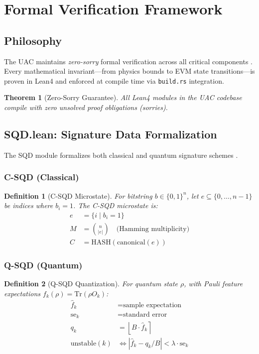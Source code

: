 \documentclass[11pt,a4paper]{article}
\newtheorem{theorem}{Theorem}
\newtheorem{definition}{Definition}
\theoremstyle{plain}
\begin{document}
\section{Formal Verification Framework}

\subsection{Philosophy}

The UAC maintains \textit{zero-sorry} formal verification across all critical components \cite{leanQuantum, leanOptimization}. Every mathematical invariant—from physics bounds to EVM state transitions—is proven in Lean4 and enforced at compile time via \texttt{build.rs} integration.

\begin{theorem}[Zero-Sorry Guarantee]
All Lean4 modules in the UAC codebase compile with zero unsolved proof obligations (\textit{sorries}).
\end{theorem}

\subsection{SQD.lean: Signature Data Formalization}

The SQD module formalizes both classical and quantum signature schemes \cite{sqdSpecification}.

\subsubsection{C-SQD (Classical)}

\begin{definition}[C-SQD Microstate]
For bitstring $b \in \{0,1\}^n$, let $e \subseteq \{0,\ldots,n-1\}$ be indices where $b_i = 1$. The C-SQD microstate is:
\begin{align}
    e &= \{i \mid b_i = 1\} \\
    M &= \binom{n}{|e|} \quad \text{(Hamming multiplicity)} \\
    C &= \text{HASH}(\text{canonical}(e))
\end{align}
\end{definition}

\subsubsection{Q-SQD (Quantum)}

\begin{definition}[Q-SQD Quantization]
For quantum state $\rho$, with Pauli feature expectations $f_k(\rho) = \text{Tr}(\rho O_k)$:
\begin{align}
    \hat{f}_k &= \text{sample expectation} \\
    \text{se}_k &= \text{standard error} \\
    q_k &= \left\lfloor B \cdot \hat{f}_k \right\rceil \\
    \text{unstable}(k) &\iff |\hat{f}_k - q_k/B| < \lambda \cdot \text{se}_k
\end{align}
\end{definition}
\end{document}
